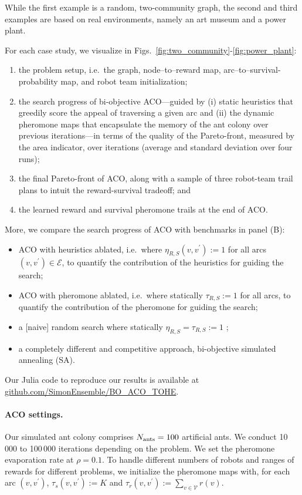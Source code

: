 \documentclass[fleqn,10pt,lineno]{wlpeerj}
\begin{document}
While the first example is a random, two-community graph, the second and third examples are based on real environments, namely an art museum and a power plant.

For each case study, we visualize in Figs.~\ref{fig:two_community}-\ref{fig:power_plant}:
\begin{enumerate}[noitemsep, label=(\Alph*)]
\item the problem setup, i.e.\ the graph, node--to--reward map, arc--to--survival-probability map, and robot team initialization;
\item the search progress of bi-objective ACO---guided by (i) static heuristics that greedily score the appeal of traversing a given arc and (ii) the dynamic pheromone maps that encapsulate the memory of the ant colony over previous iterations---in terms of the quality of the Pareto-front, measured by the area indicator, over iterations (average and standard deviation over four runs);
\item the final Pareto-front of ACO, along with a sample of three robot-team trail plans to intuit the reward-survival tradeoff; and
\item the learned reward and survival pheromone trails at the end of ACO.
\end{enumerate}
More, we compare the search progress of ACO with benchmarks in panel (B): 
\begin{itemize}[noitemsep]
\item ACO with heuristics ablated, i.e.\ where $\eta_{R, S}(v, v^\prime):=1$ for all arcs $(v, v^\prime)\in\mathcal{E}$, to quantify the contribution of the heuristics for guiding the search;
\item ACO with pheromone ablated, i.e.\ where statically $\tau_{R, S}:=1$ for all arcs, to quantify the contribution of the pheromone for guiding the search;
\item a [naive] random search where statically $\eta_{R, S}=\tau_{R,S}:=1$ ;
\item a completely different and competitive approach, bi-objective simulated annealing (SA).
\end{itemize}

Our Julia code to reproduce our results is available at \url{github.com/SimonEnsemble/BO_ACO_TOHE}.

\paragraph{ACO settings.} Our simulated ant colony comprises $N_{\rm ants}=100$ artificial ants. We conduct 10\,000 to 100\,000 iterations depending on the problem.
We set the pheromone evaporation rate at $\rho=0.1$. To handle different numbers of robots and ranges of rewards for different problems, we initialize the pheromone maps with, for each arc $(v, v^\prime)$, $\tau_s(v, v^\prime) := K$ and $\tau_r(v, v^\prime) := \sum_{v \in \mathcal{V}} r(v)$.
\end{document}
